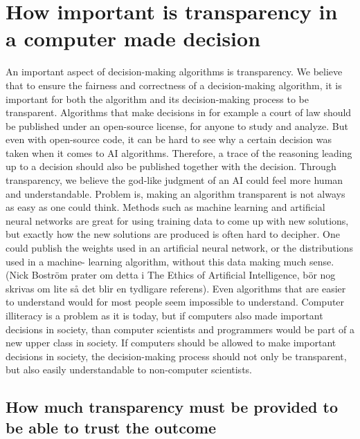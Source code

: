 \documentclass[11pt]{article}
\begin{document}
\section{How important is transparency in a computer made decision}
An important aspect of decision-making algorithms is transparency. We believe that to ensure the
fairness and correctness of a decision-making algorithm, it is important for
both the algorithm and its decision-making process to be transparent. Algorithms
that make decisions in for example a court of law should be published under an
open-source license, for anyone to study and analyze. But even with open-source
code, it can be hard to see why a certain decision was taken when it comes to AI
algorithms. Therefore, a trace of the reasoning leading up to a decision should
also be published together with the decision. Through transparency, we believe
the god-like judgment of an AI could feel more human and understandable.
Problem is, making an algorithm transparent is not always as easy as one could
think. Methods such as machine learning and artificial neural networks are great
for using training data to come up with new solutions, but exactly how the new
solutions are produced is often hard to decipher. One could publish the weights
used in an artificial neural network, or the distributions used in a machine-
learning algorithm, without this data making much sense. (Nick Boström prater
om detta i The Ethics of Artificial Intelligence, bör nog skrivas om lite så
det blir en tydligare referens). Even algorithms that are easier to understand
would for most people seem impossible to understand. Computer illiteracy is a
problem as it is today, but if computers also made important decisions in
society, than computer scientists and programmers would be part of a new upper
class in society.  If computers should be
allowed to make important decisions in society, the decision-making process
should not only be transparent, but also easily understandable to non-computer
scientists.



\subsection{How much transparency must be provided to be able to trust the outcome}
\end{document}
